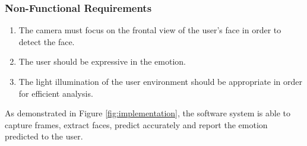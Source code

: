 \documentclass[master]{thesis-uestc}
\begin{document}
\subsubsection*{Non-Functional Requirements}
\begin{enumerate}
    \item The camera must focus on the frontal view of the user's face in order to detect the face.
    \item The user should be expressive in the emotion.
    \item The light illumination of the user environment should be appropriate in order for efficient analysis.
\end{enumerate}
As demonstrated in Figure \ref{fig:implementation}, the software system is able to capture frames, extract faces, predict accurately and report the emotion predicted to the user.  
\end{document}
